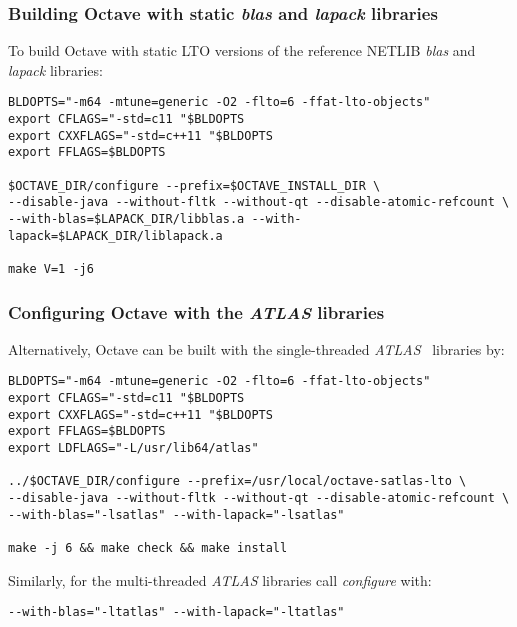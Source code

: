 \documentclass[a4paper,twoside,10pt,english]{report}
\begin{document}
\subsubsection*{Building Octave with static \emph{blas} and \emph{lapack} libraries}
To build Octave with static LTO versions of the reference NETLIB \emph{blas} 
and \emph{lapack} libraries:
\begin{small}
\begin{verbatim}
BLDOPTS="-m64 -mtune=generic -O2 -flto=6 -ffat-lto-objects"
export CFLAGS="-std=c11 "$BLDOPTS
export CXXFLAGS="-std=c++11 "$BLDOPTS
export FFLAGS=$BLDOPTS
                                                        
$OCTAVE_DIR/configure --prefix=$OCTAVE_INSTALL_DIR \
--disable-java --without-fltk --without-qt --disable-atomic-refcount \
--with-blas=$LAPACK_DIR/libblas.a --with-lapack=$LAPACK_DIR/liblapack.a

make V=1 -j6
\end{verbatim}
\end{small}
\subsubsection*{Configuring Octave with the  \emph{ATLAS} libraries}
Alternatively, Octave can be built with the single-threaded
\emph{ATLAS}~\cite{ATLAS_website} libraries by:
\begin{small}
\begin{verbatim}
BLDOPTS="-m64 -mtune=generic -O2 -flto=6 -ffat-lto-objects"
export CFLAGS="-std=c11 "$BLDOPTS
export CXXFLAGS="-std=c++11 "$BLDOPTS
export FFLAGS=$BLDOPTS
export LDFLAGS="-L/usr/lib64/atlas"

../$OCTAVE_DIR/configure --prefix=/usr/local/octave-satlas-lto \
--disable-java --without-fltk --without-qt --disable-atomic-refcount \
--with-blas="-lsatlas" --with-lapack="-lsatlas"

make -j 6 && make check && make install
\end{verbatim}
\end{small}
Similarly, for the multi-threaded \emph{ATLAS} libraries call \emph{configure} 
with:
\begin{verbatim}
--with-blas="-ltatlas" --with-lapack="-ltatlas"
\end{verbatim}
\end{document}
